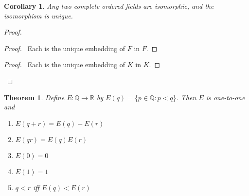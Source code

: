 \documentclass{article}
\let\qed\relax
\newtheorem{theorem}[axiom]{Theorem}
\newtheorem{corollary}{Corollary}[axiom]
\theoremstyle{definition}
\begin{document}
    \begin{corollary}
        Any two complete ordered fields are isomorphic, and the isomorphism is unique.
    \end{corollary}

    \begin{proof}
        \pf
        \begin{proof}
            \pf\ Each is the unique embedding of $F$ in $F$.
        \end{proof}
        \begin{proof}
            \pf\ Each is the unique embedding of $K$ in $K$.
        \end{proof}
        \qed
    \end{proof}

    \begin{theorem}
        Define $E : \mathbb{Q} \rightarrow \mathbb{R}$ by $E(q) = \{ p \in \mathbb{Q} : p < q \}$.
        Then $E$ is one-to-one and
        \begin{enumerate}
            \item $E(q+r) = E(q) + E(r)$
            \item $E(qr) = E(q) E(r)$
            \item $E(0) = 0$
            \item $E(1) = 1$
            \item $q < r$ iff $E(q) < E(r)$
        \end{enumerate}
    \end{theorem}
\end{document}
